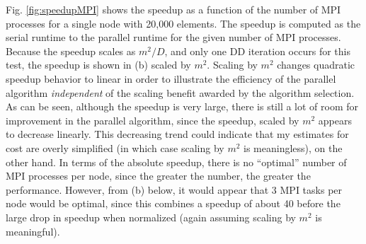 \documentclass[10pt]{article}
\begin{document}
Fig. \ref{fig:speedupMPI} shows the speedup as a function of the number of MPI processes for a single node with 20,000 elements. The speedup is computed as the serial runtime to the parallel runtime for the given number of MPI processes. Because the speedup scales as \(m^2/D\), and only one DD iteration occurs for this test, the speedup is shown in (b) scaled by \(m^2\). Scaling by \(m^2\) changes quadratic speedup behavior to linear in order to illustrate the efficiency of the parallel algorithm {\it independent} of the scaling benefit awarded by the algorithm selection. As can be seen, although the speedup is very large, there is still a lot of room for improvement in the parallel algorithm, since the speedup, scaled by \(m^2\) appears to decrease linearly. This decreasing trend could indicate that my estimates for cost are overly simplified (in which case scaling by \(m^2\) is meaningless), on the other hand. In terms of the absolute speedup, there is no ``optimal'' number of MPI processes per node, since the greater the number, the greater the performance. However, from (b) below, it would appear that 3 MPI tasks per node would be optimal, since this combines a speedup of about 40 before the large drop in speedup when normalized (again assuming scaling by \(m^2\) is meaningful). 
\end{document}
